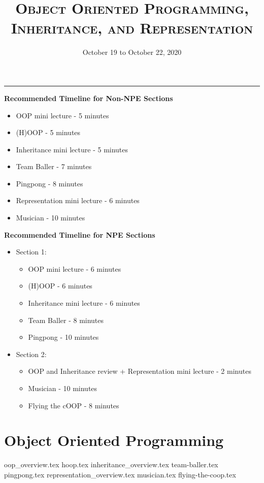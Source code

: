 \documentclass{exam}
\title{\textsc{Object Oriented Programming, Inheritance, and Representation}}
\date{October 19 to October 22, 2020}
\begin{document}
\maketitle
\rule{\textwidth}{0.15em}
\fontsize{12}{15}\selectfont

\begin{guide}
\textbf{Recommended Timeline for Non-NPE Sections}
\begin{itemize}
	\item OOP mini lecture - 5 minutes
	\item (H)OOP - 5 minutes
	\item Inheritance mini lecture - 5 minutes
	\item Team Baller - 7 minutes
	\item Pingpong - 8 minutes
	\item Representation mini lecture - 6 minutes
	\item Musician - 10 minutes
\end{itemize}
\vspace{.5cm}
\textbf{Recommended Timeline for NPE Sections}
\begin{itemize}
	\item Section 1:
	\begin{itemize}
	\item OOP mini lecture - 6 minutes
	\item (H)OOP - 6 minutes
	\item Inheritance mini lecture - 6 minutes
	\item Team Baller - 8 minutes
	\item Pingpong - 10 minutes
	\end{itemize}
	\item Section 2:
	\begin{itemize}
	\item OOP and Inheritance review + Representation mini lecture - 2 minutes
	\item Musician - 10 minutes
	\item Flying the cOOP - 8 minutes
	\end{itemize}
\end{itemize}
\end{guide}
\section{Object Oriented Programming}
\begin{questions}
{oop_overview.tex}
{hoop.tex}
\newpage
{inheritance_overview.tex}
{team-baller.tex}
{pingpong.tex}
\newpage
{representation_overview.tex}
{musician.tex}
{flying-the-coop.tex}
\end{questions}
\end{document}
